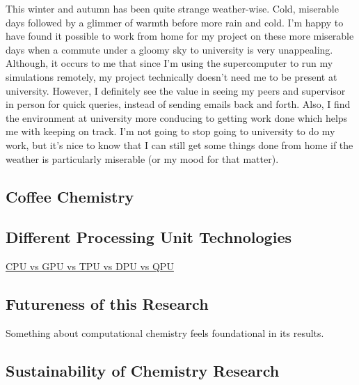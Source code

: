 \documentclass[11pt]{article}
\begin{document}
This winter and autumn has been quite strange weather-wise. Cold, miserable days followed by a glimmer of warmth before more rain and cold. I'm happy to have found it possible to work from home for my project on these more miserable days when a commute under a gloomy sky to university is very unappealing. Although, it occurs to me that since I'm using the supercomputer to run my simulations remotely, my project technically doesn't need me to be present at university. However, I definitely see the value in seeing my peers and supervisor in person for quick queries, instead of sending emails back and forth. Also, I find the environment at university more conducing to getting work done which helps me with keeping on track. I'm not going to stop going to university to do my work, but it's nice to know that I can still get some things done from home if the weather is particularly miserable (or my mood for that matter). 

\subsection{Coffee Chemistry}



\subsection{Different Processing Unit Technologies}

\href{https://www.youtube.com/watch?v=gd5uJ7Nlvvo}{CPU vs GPU vs TPU vs DPU vs QPU}

\subsection{Futureness of this Research}

Something about computational chemistry feels foundational in its results.

\subsection{Sustainability of Chemistry Research}
\end{document}
